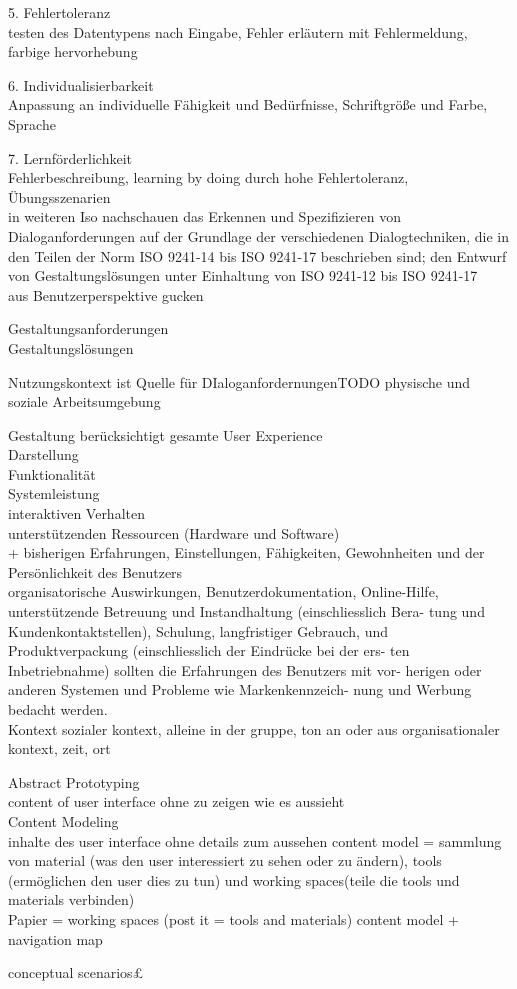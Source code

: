  5. Fehlertoleranz\\
 	testen des Datentypens nach Eingabe, Fehler erläutern mit Fehlermeldung, farbige hervorhebung 

 6. Individualisierbarkeit\\
 	Anpassung an individuelle Fähigkeit und Bedürfnisse, Schriftgröße und Farbe, Sprache

 7. Lernförderlichkeit\\
 	Fehlerbeschreibung, learning by doing durch hohe Fehlertoleranz, Übungsszenarien\\

 	in weiteren Iso nachschauen
 	das Erkennen und Spezifizieren von Dialoganforderungen auf der Grundlage der verschiedenen Dialogtechniken, die in den Teilen der Norm ISO 9241-14 bis ISO 9241-17 beschrieben sind;
 den Entwurf von Gestaltungslösungen unter Einhaltung von ISO 9241-12 bis ISO 9241-17\\

 aus Benutzerperspektive gucken

 Gestaltungsanforderungen\\
 Gestaltungslösungen

 Nutzungskontext ist Quelle für DIaloganfordernungenTODO physische und soziale Arbeitsumgebung

 Gestaltung berücksichtigt gesamte User Experience\\
 Darstellung\\
 Funktionalität\\
 Systemleistung\\
 interaktiven Verhalten\\
 unterstützenden Ressourcen (Hardware und Software)\\
 + bisherigen Erfahrungen, Einstellungen, Fähigkeiten, Gewohnheiten und der Persönlichkeit des Benutzers\\

 organisatorische Auswirkungen, Benutzerdokumentation, Online-Hilfe, unterstützende Betreuung und Instandhaltung (einschliesslich Bera- tung und Kundenkontaktstellen), Schulung, langfristiger Gebrauch, und Produktverpackung (einschliesslich der Eindrücke bei der ers- ten Inbetriebnahme) sollten die Erfahrungen des Benutzers mit vor- herigen oder anderen Systemen und Probleme wie Markenkennzeich- nung und Werbung bedacht werden.\\

 Kontext sozialer kontext, alleine in der gruppe, ton an oder aus
 organisationaler kontext, zeit, ort

 Abstract Prototyping\\
 content of user interface ohne zu zeigen wie es aussieht\\

 Content Modeling \\
 inhalte des user interface ohne details zum aussehen
 content model = sammlung von material (was den user interessiert zu sehen oder zu ändern), tools (ermöglichen den user dies zu tun) und working spaces(teile die tools und materials verbinden)\\

 Papier = working spaces (post it = tools and materials)
 content model + navigation map

 conceptual scenarios£